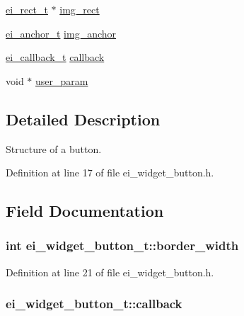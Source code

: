 \begin{DoxyCompactItemize}
\item 
\hyperlink{structei__rect__t}{ei\-\_\-rect\-\_\-t} $\ast$ \hyperlink{structei__widget__button__t_aa41be279677fbc141d0e7a8041afd936}{img\-\_\-rect}
\item 
\hyperlink{ei__types_8h_a3852c963af609d31d7cfcff79c4c8450}{ei\-\_\-anchor\-\_\-t} \hyperlink{structei__widget__button__t_a24dc795533f63d7759d2572b3899ca7c}{img\-\_\-anchor}
\item 
\hyperlink{ei__widget_8h_a52cc2158a16cbba536b8e25d2a5da712}{ei\-\_\-callback\-\_\-t} \hyperlink{structei__widget__button__t_ae676092d353684d49ff6fac56b965831}{callback}
\item 
void $\ast$ \hyperlink{structei__widget__button__t_a77f0c278c449eb8e90f6a7f8415ac882}{user\-\_\-param}
\end{DoxyCompactItemize}


\subsection{Detailed Description}
Structure of a button. 

Definition at line 17 of file ei\-\_\-widget\-\_\-button.\-h.



\subsection{Field Documentation}
\hypertarget{structei__widget__button__t_a6bcd339f4094c369a4542e71dcd46ae6}{
\subsubsection[{border\-\_\-width}]{\setlength{\rightskip}{0pt plus 5cm}int ei\-\_\-widget\-\_\-button\-\_\-t\-::border\-\_\-width}}\label{structei__widget__button__t_a6bcd339f4094c369a4542e71dcd46ae6}


Definition at line 21 of file ei\-\_\-widget\-\_\-button.\-h.

\hypertarget{structei__widget__button__t_ae676092d353684d49ff6fac56b965831}{
\subsubsection[{callback}]{ ei\-\_\-widget\-\_\-button\-\_\-t\-::callback}}\label{structei__widget__button__t_ae676092d353684d49ff6fac56b965831}


